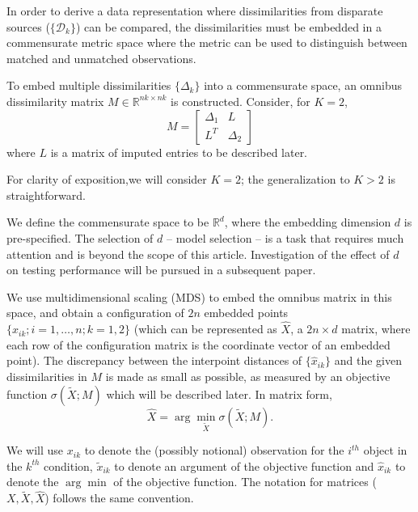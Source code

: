 \documentclass[12pt]{article} %
\newenvironment{remark}[1][Remark]{\begin{trivlist}
\item[\hskip \labelsep {\bfseries #1}]}{\end{trivlist}}
\begin{document}
  In order to derive a data representation where dissimilarities from disparate sources ($\{\mathcal{D}_k\}$)  can be compared, the dissimilarities must be embedded in a commensurate metric space where the metric can be used to distinguish between matched and unmatched observations.


To embed multiple dissimilarities  $\{\Delta_k\}$  into a commensurate space, an omnibus dissimilarity matrix  $M \in \mathbb{R}^{nk \times nk}$  is constructed. Consider, for $K=2$,
 \begin{equation}
M=  \left[ \begin{array}{cc}
         \Delta_1 & L\\
        L^T  & \Delta_2 
     \end{array}  \right]     \label{omnibus} 
\end{equation} where $L$ is a matrix of imputed entries to be described later. 

\begin{remark}
For clarity of exposition,we will consider $K=2$; the generalization to $K>2$ is straightforward. 
\end{remark}

We define the commensurate space to be  $\mathbb{R}^d$, where the embedding dimension $d$ is pre-specified. The selection of $d$ -- model selection -- is  a task that requires much attention and is  beyond the scope of this article. Investigation of the effect of $d$ on testing performance will be pursued in a  subsequent paper.

 We use multidimensional scaling (MDS) \cite{borg+groenen:1997} to embed  the omnibus matrix in this  space, and obtain  a configuration of $2n$ embedded points $\{\hat{x}_{ik}; i=1,\ldots,n;k=1,2\}$ (which can be represented as $\hat{X}$, a $2n \times d$ matrix, where each row of the configuration matrix is the coordinate vector of an embedded point). The discrepancy between the interpoint distances of $\{\hat{x}_{ik}\}$ and the given dissimilarities in  $M$ is made as small  as possible, as measured by an objective function $\sigma(\widetilde{X};M)$ which will be described later. In matrix form, $$ \hat{X}=\arg \min_{\widetilde{X}} \sigma(\widetilde{X};M).$$ 

\begin{remark} 
We will use $x_{ik}$ to denote the (possibly notional)  observation  for the $i^{th}$ object in the $k^{th}$ condition, $\tilde{x}_{ik}$ to denote an argument of the objective function  and  $\hat{x}_{ik}$  to denote the $\arg\min$  of the objective function. The notation for matrices ($X,\widetilde{X},\hat{X}$) follows the  same convention.
\end{remark}
\end{document}
